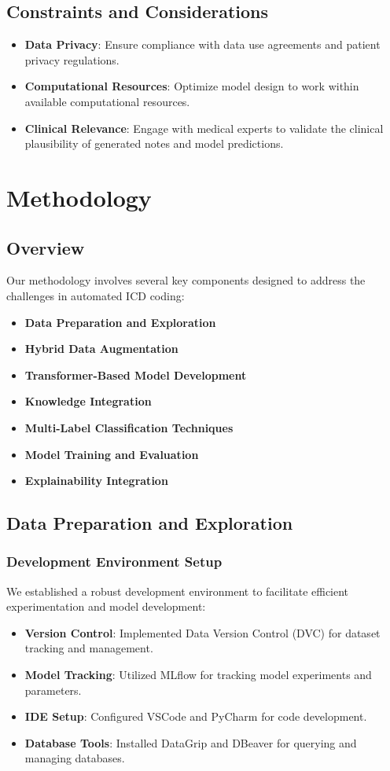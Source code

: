 \documentclass[12pt,a4paper]{report}
\begin{document}
\section{Constraints and Considerations}
\begin{itemize}
    \item \textbf{Data Privacy}: Ensure compliance with data use agreements and patient privacy regulations.
    \item \textbf{Computational Resources}: Optimize model design to work within available computational resources.
    \item \textbf{Clinical Relevance}: Engage with medical experts to validate the clinical plausibility of generated notes and model predictions.
\end{itemize}

\chapter{Methodology}

\section{Overview}
Our methodology involves several key components designed to address the challenges in automated ICD coding:
\begin{itemize}
    \item \textbf{Data Preparation and Exploration}
    \item \textbf{Hybrid Data Augmentation}
    \item \textbf{Transformer-Based Model Development}
    \item \textbf{Knowledge Integration}
    \item \textbf{Multi-Label Classification Techniques}
    \item \textbf{Model Training and Evaluation}
    \item \textbf{Explainability Integration}
\end{itemize}

\section{Data Preparation and Exploration}

\subsection{Development Environment Setup}
We established a robust development environment to facilitate efficient experimentation and model development:
\begin{itemize}
    \item \textbf{Version Control}: Implemented Data Version Control (DVC) for dataset tracking and management.
    \item \textbf{Model Tracking}: Utilized MLflow for tracking model experiments and parameters.
    \item \textbf{IDE Setup}: Configured VSCode and PyCharm for code development.
    \item \textbf{Database Tools}: Installed DataGrip and DBeaver for querying and managing databases.
\end{itemize}
\end{document}
